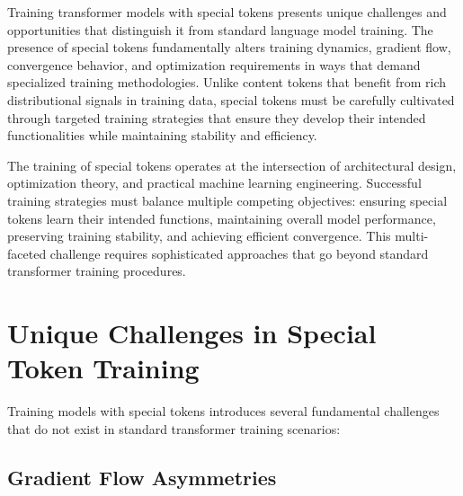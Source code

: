 
Training transformer models with special tokens presents unique challenges and opportunities that distinguish it from standard language model training. The presence of special tokens fundamentally alters training dynamics, gradient flow, convergence behavior, and optimization requirements in ways that demand specialized training methodologies. Unlike content tokens that benefit from rich distributional signals in training data, special tokens must be carefully cultivated through targeted training strategies that ensure they develop their intended functionalities while maintaining stability and efficiency.
\begin{comment}
Feedback: This is a strong opening. To make it more engaging, you could frame it as the "nurturing" phase. For example: "If designing a special token is like creating a new tool, training is the process of teaching the model how to use it. A powerful tool is useless in untrained hands. This chapter explores the specialized training techniques required to cultivate the full potential of special tokens, transforming them from simple placeholders into powerful functional components of the model's reasoning process."
\end{comment}

The training of special tokens operates at the intersection of architectural design, optimization theory, and practical machine learning engineering. Successful training strategies must balance multiple competing objectives: ensuring special tokens learn their intended functions, maintaining overall model performance, preserving training stability, and achieving efficient convergence. This multi-faceted challenge requires sophisticated approaches that go beyond standard transformer training procedures.

\section{Unique Challenges in Special Token Training}

Training models with special tokens introduces several fundamental challenges that do not exist in standard transformer training scenarios:

\subsection{Gradient Flow Asymmetries}

